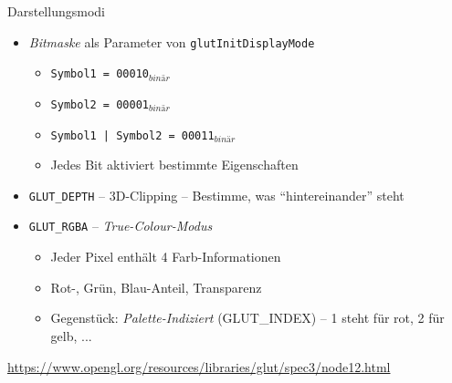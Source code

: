 \begin{frame}{Darstellungsmodi}
%
\begin{itemize}
\item \emph{Bitmaske} als Parameter von \texttt{glutInitDisplayMode}
	\begin{itemize}
	\item \texttt{Symbol1 = 00010$_{binär}$}
	\item \texttt{Symbol2 = 00001$_{binär}$}
	\item \texttt{Symbol1 | Symbol2  = 00011$_{binär}$}
	\item Jedes Bit aktiviert bestimmte Eigenschaften
	\end{itemize}
\item \texttt{GLUT\_DEPTH} -- 3D-Clipping -- Bestimme, was \enquote{hintereinander} steht
\item \texttt{GLUT\_RGBA} -- \emph{True-Colour-Modus}
	\begin{itemize}
	\item Jeder Pixel enthält 4 Farb-Informationen
	\item Rot-, Grün, Blau-Anteil, Transparenz
	\item Gegenstück: \emph{Palette-Indiziert} (GLUT\_INDEX) -- 1 steht für rot, 2 für gelb, ...
	\end{itemize}
\end{itemize}
%
\vspace{10pt}
{\scriptsize \url{https://www.opengl.org/resources/libraries/glut/spec3/node12.html}}
%
\end{frame}


